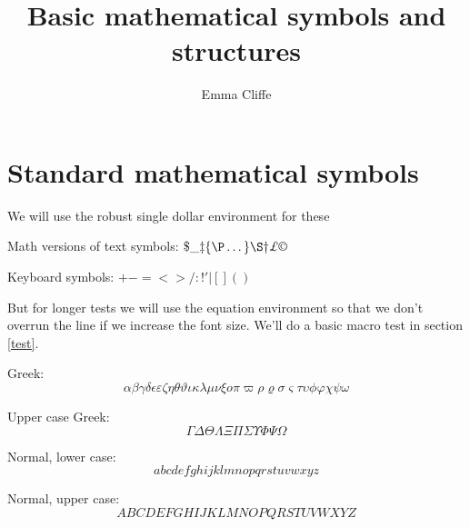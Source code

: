 


\title{Basic mathematical symbols and structures}
\author{Emma Cliffe}
\date{}


\maketitle
\tableofcontents
{}

\section{Standard mathematical symbols}

We will use the robust single dollar environment for these

Math versions of text symbols: \(\$  \_  \ddag  \{  \P  \dots  \}  \S  \dag  \pounds \copyright\)

Keyboard symbols: \(+  -  =  <  >  /  :  !  '  |  [  ]  (  )\)

\noindent 
But for longer tests we will use the equation environment so that we don't overrun the line if we increase the font size. We'll do a basic macro test in section \ref{test}.

Greek:
\begin{equation}
\alpha  \beta  \gamma  \delta  \epsilon  \varepsilon  \zeta  \eta  \theta  \vartheta  \iota  \kappa  \lambda  \mu  \nu  \xi  o  \pi  \varpi  \rho  \varrho  \sigma  \varsigma  \tau  \upsilon  \phi  \varphi  \chi  \psi  \omega
\end{equation}

Upper case Greek:
\begin{equation}
\Gamma  \Delta  \Theta  \Lambda  \Xi  \Pi  \Sigma  \Upsilon  \Phi  \Psi  \Omega
\end{equation}

Normal, lower case:
\begin{equation}
a  b  c  d  e  f  g  h  i  j  k  l  m  n  o  p  q  r  s  t  u  v  w  x  y  z
\end{equation}

Normal, upper case:
\begin{equation}
A  B  C  D  E  F  G  H  I  J  K  L  M  N  O  P  Q  R  S  T  U  V  W  X  Y  Z  
\end{equation}

